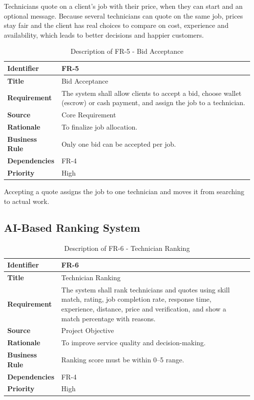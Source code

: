 \documentclass[A4paper,12pt]{report}
\theoremstyle{plain}
\theoremstyle{definition}
\theoremstyle{remark}
\numberwithin{equation}{section}
\begin{document}
Technicians quote on a client's job with their price, when they can start and an optional message. Because several technicians can quote on the same job, prices stay fair and the client has real choices to compare on cost, experience and availability, which leads to better decisions and happier customers.
\newline


\begin{table}[h!]
\centering
\caption{Description of FR-5 - Bid Acceptance}
\begin{tabular}{|p{}|p{}|}
\hline
\textbf{Identifier} & FR-5 \\ \hline
\textbf{Title} & Bid Acceptance \\ \hline
\textbf{Requirement} & The system shall allow clients to accept a bid, choose wallet (escrow) or cash payment, and assign the job to a technician. \\ \hline
\textbf{Source} & Core Requirement \\ \hline
\textbf{Rationale} & To finalize job allocation. \\ \hline
\textbf{Business Rule} & Only one bid can be accepted per job. \\ \hline
\textbf{Dependencies} & FR-4 \\ \hline
\textbf{Priority} & High \\ \hline
\end{tabular}
\end{table}

Accepting a quote assigns the job to one technician and moves it from searching to actual work.

\subsection{AI-Based Ranking System}

\begin{table}[h!]
\centering
\caption{Description of FR-6 - Technician Ranking}
\begin{tabular}{|p{}|p{}|}
\hline
\textbf{Identifier} & FR-6 \\ \hline
\textbf{Title} & Technician Ranking \\ \hline
\textbf{Requirement} & The system shall rank technicians and quotes using skill match, rating, job completion rate, response time, experience, distance, price and verification, and show a match percentage with reasons. \\ \hline
\textbf{Source} & Project Objective \\ \hline
\textbf{Rationale} & To improve service quality and decision-making. \\ \hline
\textbf{Business Rule} & Ranking score must be within 0–5 range. \\ \hline
\textbf{Dependencies} & FR-4 \\ \hline
\textbf{Priority} & High \\ \hline
\end{tabular}
\end{table}
\end{document}
